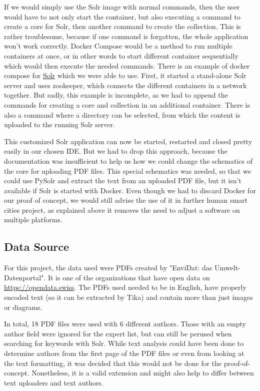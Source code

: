\documentclass[a4paper,12pt]{article}
\begin{document}
If we would simply use the Solr image with normal commands, then the user would have to not only start the container, but also executing a command to create a core for Solr, then another command to create the collection. 
This is rather troublesome, because if one command is forgotten, the whole application won't work correctly. 
Docker Compose would be a method to run multiple containers at once, or in other words to start different container sequentially which would then execute the needed commands.
There is an example of docker compose for \href{https://github.com/docker-solr/docker-solr-examples/blob/master/docker-compose/docker-compose.yml}{Solr} which we were able to use.
First, it started a stand-alone Solr server and uses zookeeper, which connects the different containers in a network together. 
But sadly, this example is incomplete, as we had to append the commands for creating a core and collection in an additional container. 
There is also a command where a directory can be selected, from which the content is uploaded to the running Solr server.


This customized Solr application can now be started, restarted and closed pretty easily in our chosen IDE. 
But we had to drop this approach, because the documentation was insufficient to help us how we could change the schematics of the core for uploading PDF files. 
This special schematics was needed, so that we could use PySolr and extract the text from an uploaded PDF file, but it isn't available if Solr is started with Docker. 
Even though we had to discard Docker for our proof of concept, we would still advise the use of it in further human smart cities project, as explained above it removes the need to adjust a software on multiple platforms.

\subsection{Data Source}
For this project, the data used were PDFs created by "EnviDat: das Umwelt-Datenportal". 
It is one of the organizations that have open data on \href{https://opendata.swiss}{https://opendata.swiss}.
The PDFs used needed to be in English, have properly encoded text (so it can be extracted by Tika) and contain more than just images or diagrams.

In total, 18 PDF files were used with 6 different authors. 
Those with an empty author field were ignored for the expert list, but can still be perused when searching for keywords with Solr.
While text analysis could have been done to determine authors from the first page of the PDF files or even from looking at the text formatting, it was decided that this would not be done for the proof-of-concept. 
Nonetheless, it is a valid extension and might also help to differ between text uploaders and text authors.
\end{document}
